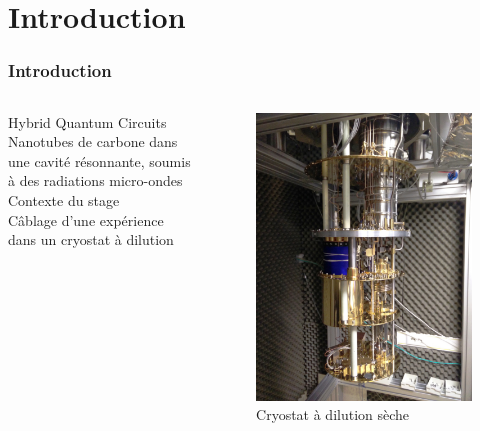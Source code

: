 \documentclass[10pt,a9paper,handout]{beamer} \usepackage[utf8]{inputenc} \usepackage[francais]{babel} \usepackage[T1]{fontenc}
\begin{document}
\section*{Introduction}
\begin{frame}
    \frametitle{Introduction}
    \begin{columns}[T]
    \begin{column}{0.6\textwidth}
    {\large Hybrid Quantum Circuits} \vspace*{1mm}\\Nanotubes de carbone dans une cavité résonnante, soumis à des radiations micro-ondes
    \\[ 5mm]
    {\large Contexte du stage} \vspace*{1mm}\\
    Câblage d'une expérience dans un cryostat à dilution
    
    \end{column}
    \begin{column}{0.4\textwidth}
        \begin{figure}[H]
            \includegraphics[width=\textwidth]{Images/Global}
            \vspace*{-3mm}\caption{Cryostat à dilution sèche}
        \end{figure}
    \end{column}
    \end{columns}
\end{frame}
\end{document}
